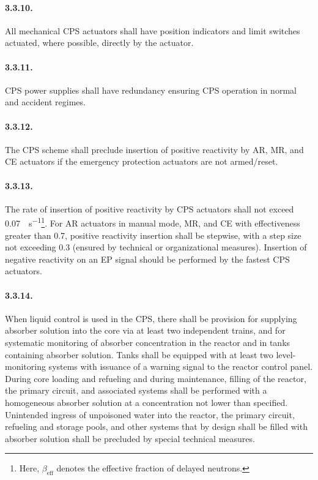 \documentclass[openright]{bookest}
\begin{document}
\paragraph{3.3.10.} All mechanical CPS actuators shall have position indicators and limit switches actuated, where possible, directly by the actuator.

\paragraph{3.3.11.} CPS power supplies shall have redundancy ensuring CPS operation in normal and accident regimes.

\paragraph{3.3.12.} The CPS scheme shall preclude insertion of positive reactivity by AR, MR, and CE actuators if the emergency protection actuators are not armed/reset.

\paragraph{3.3.13.} The rate of insertion of positive reactivity by CPS actuators shall not exceed \qty{0.07}{\betaeff\per\second}\footnote{Here, $\beta_{\text{eff}}$ denotes the effective fraction of delayed neutrons.}. For AR actuators in manual mode, MR, and CE with effectiveness greater than \qty{0.7}{\betaeff}, positive reactivity insertion shall be stepwise, with a step size not exceeding \qty{0.3}{\betaeff} (ensured by technical or organizational measures). Insertion of negative reactivity on an EP signal should be performed by the fastest CPS actuators.

\paragraph{3.3.14.} When liquid control is used in the CPS, there shall be provision for supplying absorber solution into the core via at least two independent trains, and for systematic monitoring of absorber concentration in the reactor and in tanks containing absorber solution. Tanks shall be equipped with at least two level-monitoring systems with issuance of a warning signal to the reactor control panel. During core loading and refueling and during maintenance, filling of the reactor, the primary circuit, and associated systems shall be performed with a homogeneous absorber solution at a concentration not lower than specified. Unintended ingress of unpoisoned water into the reactor, the primary circuit, refueling and storage pools, and other systems that by design shall be filled with absorber solution shall be precluded by special technical measures.
\end{document}
